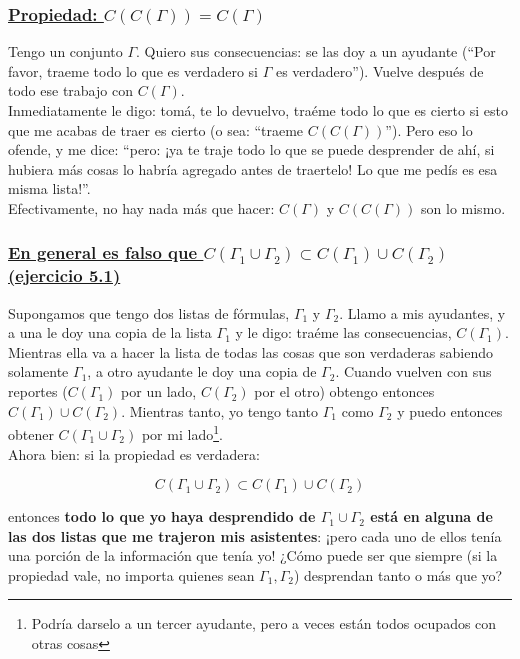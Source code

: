 \documentclass[10pt,a4paper]{article}
\newcommand{\G}{\Gamma}
\begin{document}
\subsubsection*{\underline{Propiedad: $C(C(\G)) = C(\G)$}}
Tengo un conjunto $\G$. Quiero sus consecuencias: se las doy a un ayudante (``Por favor, traeme todo lo que es verdadero si $\G$ es verdadero''). Vuelve después de todo ese trabajo con $C(\G)$. \\ 

Inmediatamente le digo: tomá, te lo devuelvo, traéme todo lo que es cierto si esto que me acabas de traer es cierto (o sea: ``traeme $C(C(\G))$''). Pero eso lo ofende, y me dice: ``pero: ¡ya te traje todo lo que se puede desprender de ahí, si hubiera más cosas lo habría agregado antes de traertelo! Lo que me pedís es esa misma lista!''.\\

Efectivamente, no hay nada más que hacer: $C(\G)$ y $C(C(\G))$ son lo mismo.

\vspace{20px}
\subsubsection*{\underline{En general es falso que $C(\G_1 \cup \G_2) \subset C(\G_1) \cup C(\G_2)$ (ejercicio 5.1)}}

Supongamos que tengo dos listas de fórmulas, $\G_1$ y $\G_2$. Llamo a mis ayudantes, y a una le doy una copia de la lista $\G_1$ y le digo: traéme las consecuencias, $C(\G_1)$. Mientras ella va a hacer la lista de todas las cosas que son verdaderas sabiendo solamente $\G_1$, a otro ayudante le doy una copia de $\G_2$. Cuando vuelven con sus reportes ($C(\G_1)$ por un lado, $C(\G_2)$ por el otro) obtengo entonces $C(\G_1) \cup C(\G_2)$. Mientras tanto, yo tengo tanto $\G_1$ como $\G_2$ y puedo entonces obtener $C(\G_1 \cup \G_2)$ por mi lado\footnote{Podría darselo a un tercer ayudante, pero a veces están todos ocupados con otras cosas}. \\

Ahora bien: si la propiedad es verdadera:

\[ C(\G_1 \cup \G_2) \subset C(\G_1) \cup C(\G_2) \]

entonces \textbf{todo lo que yo haya desprendido de $\G_1 \cup \G_2$ está en alguna de las dos listas que me trajeron mis asistentes}: ¡pero cada uno de ellos tenía una porción de la información que tenía yo! ¿Cómo puede ser que siempre (si la propiedad vale, no importa quienes sean $\G_1, \G_2$) desprendan tanto o más que yo?\\
\end{document}
